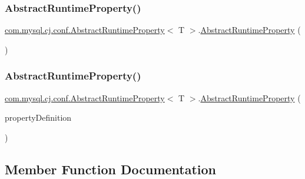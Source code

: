 \subsubsection{\texorpdfstring{Abstract\+Runtime\+Property()}{AbstractRuntimeProperty()}\hspace{0.1cm}{\footnotesize\ttfamily [1/2]}}
{\footnotesize\ttfamily \mbox{\hyperlink{classcom_1_1mysql_1_1cj_1_1conf_1_1_abstract_runtime_property}{com.\+mysql.\+cj.\+conf.\+Abstract\+Runtime\+Property}}$<$ T $>$.\mbox{\hyperlink{classcom_1_1mysql_1_1cj_1_1conf_1_1_abstract_runtime_property}{Abstract\+Runtime\+Property}} (\begin{DoxyParamCaption}{ }\end{DoxyParamCaption})}

\mbox{\label{classcom_1_1mysql_1_1cj_1_1conf_1_1_abstract_runtime_property_a434e0683cc5b95d04f26ee6d908fcaf6}} 
\subsubsection{\texorpdfstring{Abstract\+Runtime\+Property()}{AbstractRuntimeProperty()}\hspace{0.1cm}{\footnotesize\ttfamily [2/2]}}
{\footnotesize\ttfamily \mbox{\hyperlink{classcom_1_1mysql_1_1cj_1_1conf_1_1_abstract_runtime_property}{com.\+mysql.\+cj.\+conf.\+Abstract\+Runtime\+Property}}$<$ T $>$.\mbox{\hyperlink{classcom_1_1mysql_1_1cj_1_1conf_1_1_abstract_runtime_property}{Abstract\+Runtime\+Property}} (\begin{DoxyParamCaption}\item[{\mbox{\hyperlink{interfacecom_1_1mysql_1_1cj_1_1conf_1_1_property_definition}{Property\+Definition}}$<$ T $>$}]{property\+Definition }\end{DoxyParamCaption})\hspace{0.3cm}{\ttfamily [protected]}}



\subsection{Member Function Documentation}
\mbox{\label{classcom_1_1mysql_1_1cj_1_1conf_1_1_abstract_runtime_property_ac64a41d2f3d03d32b3252b0747cdf030}} 
